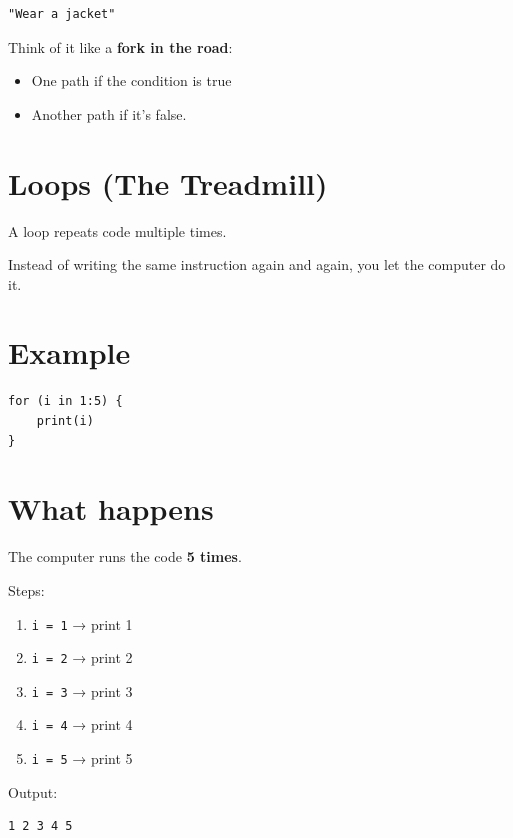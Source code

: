 \documentclass[
  letterpaper,
  DIV=11,
  numbers=noendperiod,
  oneside]{scrreprt}
\begin{document}
\begin{verbatim}
"Wear a jacket"
\end{verbatim}

Think of it like a \textbf{fork in the road}:

\begin{itemize}
\item
  One path if the condition is true
\item
  Another path if it's false.
\end{itemize}

\section{Loops (The Treadmill)}\label{loops-the-treadmill-1}

A loop repeats code multiple times.

Instead of writing the same instruction again and again, you let the
computer do it.

\section{Example}\label{example}

\begin{verbatim}
for (i in 1:5) {   
    print(i) 
}
\end{verbatim}

\section{What happens}\label{what-happens-1}

The computer runs the code \textbf{5 times}.

Steps:

\begin{enumerate}
\def\labelenumi{\arabic{enumi}.}
\item
  \texttt{i\ =\ 1} → print 1
\item
  \texttt{i\ =\ 2} → print 2
\item
  \texttt{i\ =\ 3} → print 3
\item
  \texttt{i\ =\ 4} → print 4
\item
  \texttt{i\ =\ 5} → print 5
\end{enumerate}

Output:

\begin{verbatim}
1 2 3 4 5
\end{verbatim}
\end{document}
